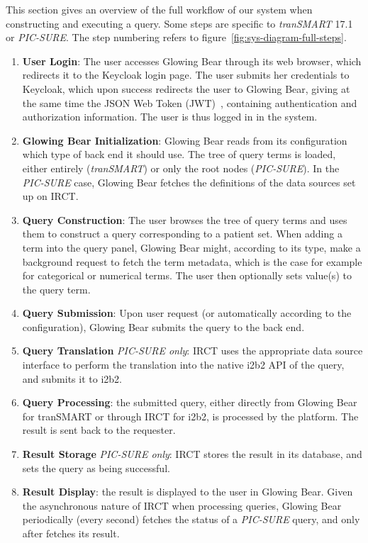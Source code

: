 This section gives an overview of the full workflow of our system when constructing and executing a query.
Some steps are specific to \textit{tranSMART} 17.1 or \textit{PIC-SURE}.
The step numbering refers to figure~\ref{fig:sys-diagram-full-steps}.

\begin{enumerate}
\item \label{enum:wf-interop-login}\textbf{User Login}:
The user accesses Glowing Bear through its web browser, which redirects it to the Keycloak login page.
The user submits her credentials to Keycloak, which upon success redirects the user to Glowing Bear, giving at the same time the JSON Web Token (JWT)~\cite{rfc:jwt}, containing authentication and authorization information.
The user is thus logged in in the system.

\item \label{enum:wf-interop-init} \textbf{Glowing Bear Initialization}:
Glowing Bear reads from its configuration which type of back end it should use.
The tree of query terms is loaded, either entirely (\textit{tranSMART}) or only the root nodes (\textit{PIC-SURE}).
In the \textit{PIC-SURE} case, Glowing Bear fetches the definitions of the data sources set up on IRCT.

\item \textbf{Query Construction}:
The user browses the tree of query terms and uses them to construct a query corresponding to a patient set.
When adding a term into the query panel, Glowing Bear might, according to its type, make a background request to fetch the term metadata, which is the case for example for categorical or numerical terms.
The user then optionally sets value(s) to the query term.

\item \textbf{Query Submission}:
Upon user request (or automatically according to the configuration), Glowing Bear submits the query to the back end.

\item \textbf{Query Translation} \textit{PIC-SURE only}: IRCT uses the appropriate data source interface to perform the translation into the native i2b2 API of the query, and submits it to i2b2.

\item \textbf{Query Processing}: the submitted query, either directly from Glowing Bear for tranSMART or through IRCT for i2b2, is processed by the platform. 
The result is sent back to the requester.

\item \textbf{Result Storage} \textit{PIC-SURE only}: IRCT stores the result in its database, and sets the query as being successful.

\item \textbf{Result Display}: the result is displayed to the user in Glowing Bear.
Given the asynchronous nature of IRCT when processing queries, Glowing Bear periodically (every second) fetches the status of a \textit{PIC-SURE} query, and only after fetches its result.

\end{enumerate}


